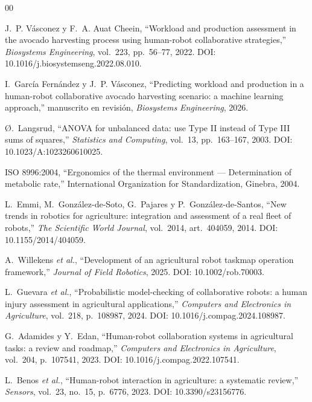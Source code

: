 \documentclass[conference]{IEEEtran}
\begin{document}
\begin{thebibliography}{00}

J.~P. Vásconez y F.~A. Auat Cheein, ``Workload and production assessment in the avocado harvesting process using human-robot collaborative strategies,''
\textit{Biosystems Engineering}, vol.~223, pp.~56--77, 2022.
DOI: 10.1016/j.biosystemseng.2022.08.010.

I.~García Fernández y J.~P. Vásconez, ``Predicting workload and production in a human-robot collaborative avocado harvesting scenario: a machine learning approach,''
manuscrito en revisión, \textit{Biosystems Engineering}, 2026.

{\O}.~Langsrud, ``ANOVA for unbalanced data: use Type II instead of Type III sums of squares,''
\textit{Statistics and Computing}, vol.~13, pp.~163--167, 2003.
DOI: 10.1023/A:1023260610025.

ISO 8996:2004, ``Ergonomics of the thermal environment --- Determination of metabolic rate,''
International Organization for Standardization, Ginebra, 2004.

L.~Emmi, M.~González-de-Soto, G.~Pajares y P.~González-de-Santos, ``New trends in robotics for agriculture: integration and assessment of a real fleet of robots,''
\textit{The Scientific World Journal}, vol.~2014, art.~404059, 2014.
DOI: 10.1155/2014/404059.

A.~Willekens \textit{et al.}, ``Development of an agricultural robot taskmap operation framework,''
\textit{Journal of Field Robotics}, 2025.
DOI: 10.1002/rob.70003.

L.~Guevara \textit{et al.}, ``Probabilistic model-checking of collaborative robots: a human injury assessment in agricultural applications,''
\textit{Computers and Electronics in Agriculture}, vol.~218, p.~108987, 2024.
DOI: 10.1016/j.compag.2024.108987.

G.~Adamides y Y.~Edan, ``Human-robot collaboration systems in agricultural tasks: a review and roadmap,''
\textit{Computers and Electronics in Agriculture}, vol.~204, p.~107541, 2023.
DOI: 10.1016/j.compag.2022.107541.

L.~Benos \textit{et al.}, ``Human-robot interaction in agriculture: a systematic review,''
\textit{Sensors}, vol.~23, no.~15, p.~6776, 2023.
DOI: 10.3390/s23156776.


\end{thebibliography}
\end{document}
